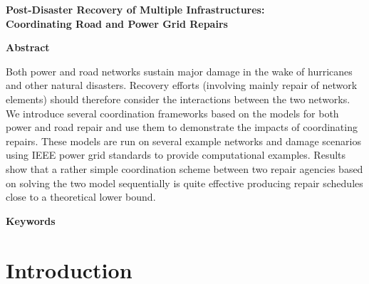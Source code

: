 \documentclass[10pt]{article}
\begin{document}
\newpage
\thispagestyle{empty}
\begin{center}
{\Large \textbf{Post-Disaster Recovery of Multiple Infrastructures: \\ Coordinating Road and Power Grid Repairs}} \\
\vspace*{0.2cm}
\end{center}

\thispagestyle{empty}
\begin{center}
{\large \bf Abstract}
\end{center}
Both power and road networks sustain major damage in the wake of hurricanes and other natural disasters. Recovery efforts (involving mainly repair of network elements)  should therefore consider the interactions between the two networks. We introduce several coordination frameworks based on the models for both power and road repair and use them to demonstrate the impacts of coordinating repairs. These models are run on several example networks and damage scenarios using IEEE power grid standards to provide computational examples. Results show that a rather simple coordination scheme between two repair agencies based on solving the two model sequentially is quite effective producing repair schedules close to a theoretical lower bound.


{\large \bf Keywords}\\
\vspace*{-12pt}

\vspace*{-12pt}
\section{{\large Introduction}}
\label{sec:ic:intro}
\vspace*{-12pt}
\end{document}
